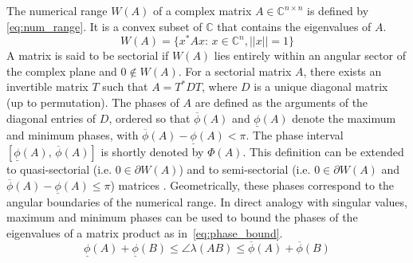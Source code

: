 The numerical range $W(A)$ of a complex matrix $A\in \mathbb{C}^{n\times n}$ is defined by \eqref{eq:num_range}. It is a convex subset of $\mathbb{C}$ that contains the eigenvalues of $A$.
\begin{equation}
    W(A)=\{ x^*Ax:\,x\in\mathbb{C}^n, ||x||=1\}
    \label{eq:num_range}
\end{equation}
A matrix is said to be sectorial if $W(A)$ lies entirely within an angular sector of the complex plane and $0 \notin W(A)$. For a sectorial matrix $A$, there exists an invertible matrix $T$ such that $A=T^*DT$, where $D$ is a unique diagonal matrix (up to permutation). 
The phases of $A$ are defined as the arguments of the diagonal entries of $D$, ordered so that $\overline{\phi}(A)$ and $\underline{\phi}(A)$ denote the maximum and minimum phases, with $\overline{\phi}(A)-\underline{\phi}(A) < \pi$. The phase interval $[\underline{\phi}(A),\, \overline{\phi}(A)]$ is shortly denoted by $\Phi(A)$. This definition can be extended to quasi-sectorial (i.e. $0 \in \partial W(A)$) and to semi-sectorial (i.e. $0 \in \partial W(A)$ and $\overline{\phi}(A)-\underline{\phi}(A) \leq \pi$) matrices \cite{chenPhaseTheoryMIMO2022}.
Geometrically, these phases correspond to the angular boundaries of the numerical range. In direct analogy with singular values, maximum and minimum phases can be used to bound the phases of the eigenvalues of a matrix product as in~\eqref{eq:phase_bound}.
\begin{equation}
    \underline{\phi}(A)+\underline{\phi}(B) \leq \angle{\lambda(AB)} \leq \overline{\phi}(A)+\overline{\phi}(B) 
    \label{eq:phase_bound}
\end{equation}